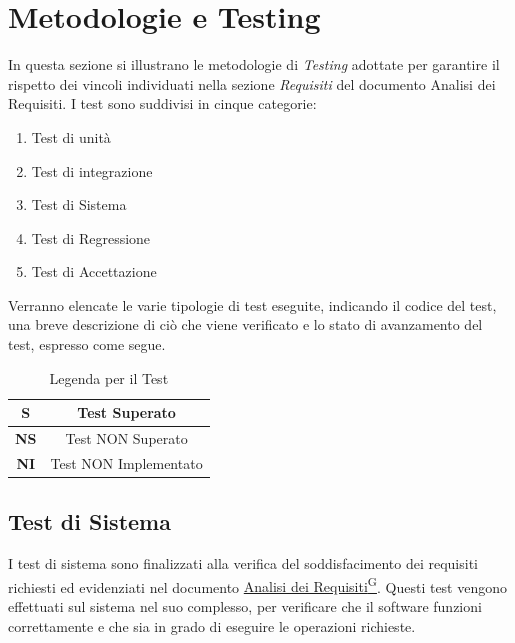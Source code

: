 \documentclass{article}
\begin{document}
\section{Metodologie e Testing}
In questa sezione si illustrano le metodologie di \textit{Testing} adottate per garantire il rispetto dei vincoli individuati
nella sezione \textit{Requisiti} del documento Analisi dei Requisiti. I test sono suddivisi in cinque categorie:
\begin{enumerate}
    \item Test di unità
    \item Test di integrazione
    \item Test di Sistema
    \item Test di Regressione
    \item Test di Accettazione
\end{enumerate}
Verranno elencate le varie tipologie di test eseguite, indicando il codice del test, una breve descrizione di ciò che viene verificato e lo stato di avanzamento del test, espresso come segue.

\begin{table}[H]
    \centering
    \renewcommand{\arraystretch}{1.5}
\begin{tabular}{|c|c|}
    \hline
    \textbf{S} & Test Superato \\
    \hline
    \textbf{NS} & Test NON Superato \\
    \hline
    \textbf{NI} & Test NON Implementato \\
    \hline
\end{tabular}
\caption{Legenda per il Test}
\end{table}


\subsection{Test di Sistema} %
I test di sistema sono finalizzati alla verifica del soddisfacimento dei requisiti richiesti ed evidenziati nel documento
\href{https://code7crusaders.github.io/docs/RTB/documentazione_interna/glossario.html#analisi-dei-requisiti}{Analisi dei Requisiti\textsuperscript{G}}. Questi test vengono effettuati sul sistema nel suo complesso, per verificare che il software funzioni correttamente
e che sia in grado di eseguire le operazioni richieste.

\renewcommand{\arraystretch}{1.5}  %
\end{document}
